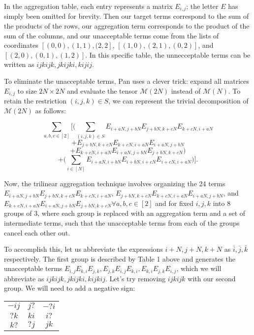 \documentclass{article}
\begin{document}
In the aggregation table, each entry represents a matrix $E_{i,j}$; the letter $E$ has simply been omitted for brevity. Then our target terms correspond to the sum of the products of the rows, our aggregation term corresponds to the product of the sum of the columns, and our unacceptable terms come from the lists of coordinates $[(0,0),(1,1),(2,2]$, $[(1,0),(2,1),(0,2)]$, and $[(2,0),(0,1),(1,2)]$. In this specific table, the unnecceptable terms can be written as $ijkijk,jkijki,kijij$.

To eliminate the unacceptable terms, Pan uses a clever trick: expand all matrices $E_{i,j}$ to size $2N\times 2N$ and evaluate the tensor $\mathcal{M}(2N)$ instead of $\mathcal{M}(N)$. To retain the restriction $(i,j,k)\in S$, we can represent the trivial decomposition of $\mathcal{M}(2N)$ as follows:

\[\sum_{a,b,c\in [2]}\Big[\Big(\sum_{(i,j,k)\in S}E_{i+aN,j+bN}E_{j+bN,k+cN}E_{k+cN,i+aN}\]\[+E_{j+bN,k+cN}E_{k+cN,i+aN}E_{i+aN,j+bN}\]\[+E_{k+cN,i+aN}E_{i+aN,j+bN}E_{j+bN,k+cN}\Big)\]\[+\Big(\sum_{i\in [N]} E_{i+aN,i+bN}E_{i+bN,i+cN}E_{i+cN,i+aN}\Big)\Big].\]

Now, the trilinear aggregation technique involves organizing the 24 terms $E_{i+aN,j+bN}E_{j+bN,k+cN}E_{k+cN,i+aN}$, $E_{j+bN,k+cN}E_{k+cN,i+aN}E_{i+aN,j+bN}$, and\\ $E_{k+cN,i+aN}E_{i+aN,j+bN}E_{j+bN,k+cN} \forall a,b,c\in [2]$ and for fixed $i,j,k$ into 8 groups of 3, where each group is replaced with an aggregation term and a set of intermediate terms, such that the unacceptable terms from each of the groups cancel each other out.

To accomplish this, let us abbreviate the expressions $i+N,j+N,k+N$ as $\bar{i},\bar{j},\bar{k}$ respectively. The first group is described by Table 1 above and generates the unacceptable terms $E_{i,j}E_{k,i}E_{j,k},E_{j,k}E_{i,j}E_{k,i},E_{k,i}E_{j,k}E_{i,j}$, which we will abbreviate as $ijkijk,jkijki,kijkij$. Let's try removing $ijkijk$ with our second group. We will need to add a negative sign:

\begin{table}[H]
    \centering
    \begin{tabular}{c|c|c}
        $-ij$ & $j?$ & $-?i$ \\
        $?k$ & $ki$ & $i?$ \\
        $k?$ & $?j$ & $jk$ \\
    \end{tabular}
\end{table}
\end{document}
